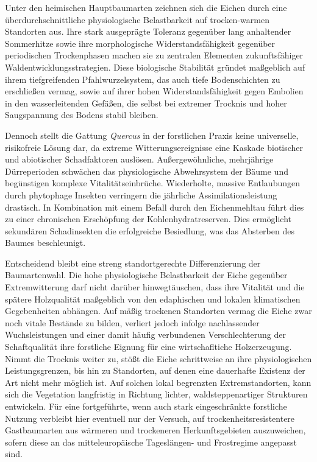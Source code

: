 \documentclass[twocolumn, bibliography=totoc, abstract=true]{scrartcl}
\begin{document}
Unter den heimischen Hauptbaumarten zeichnen sich die Eichen durch eine überdurchschnittliche physiologische Belastbarkeit auf trocken-warmen Standorten aus. Ihre stark ausgeprägte Toleranz gegenüber lang anhaltender Sommerhitze sowie ihre morphologische Widerstandsfähigkeit gegenüber periodischen Trockenphasen machen sie zu zentralen Elementen zukunftsfähiger Waldentwicklungsstrategien. Diese biologische Stabilität gründet maßgeblich auf ihrem tiefgreifenden Pfahlwurzelsystem, das auch tiefe Bodenschichten zu erschließen vermag, sowie auf ihrer hohen Widerstandsfähigkeit gegen Embolien in den wasserleitenden Gefäßen, die selbst bei extremer Trocknis und hoher Saugspannung des Bodens stabil bleiben.

Dennoch stellt die Gattung \textit{Quercus} in der forstlichen Praxis keine universelle, risikofreie Lösung dar, da extreme Witterungsereignisse eine Kaskade biotischer und abiotischer Schadfaktoren auslösen. Außergewöhnliche, mehrjährige Dürreperioden schwächen das physiologische Abwehrsystem der Bäume und begünstigen komplexe Vitalitätseinbrüche. Wiederholte, massive Entlaubungen durch phytophage Insekten verringern die jährliche Assimilationsleistung drastisch. In Kombination mit einem Befall durch den Eichenmehltau führt dies zu einer chronischen Erschöpfung der Kohlenhydratreserven. Dies ermöglicht sekundären Schadinsekten die erfolgreiche Besiedlung, was das Absterben des Baumes beschleunigt.

Entscheidend bleibt eine streng standortgerechte Differenzierung der Baumartenwahl. Die hohe physiologische Belastbarkeit der Eiche gegenüber Extremwitterung darf nicht darüber hinwegtäuschen, dass ihre Vitalität und die spätere Holzqualität maßgeblich von den edaphischen und lokalen klimatischen Gegebenheiten abhängen. Auf mäßig trockenen Standorten vermag die Eiche zwar noch vitale Bestände zu bilden, verliert jedoch infolge nachlassender Wuchsleistungen und einer damit häufig verbundenen Verschlechterung der Schaftqualität ihre forstliche Eignung für eine wirtschafltiche Holzerzeugung. Nimmt die Trocknis weiter zu, stößt die Eiche schrittweise an ihre physiologischen Leistungsgrenzen, bis hin zu Standorten, auf denen eine dauerhafte Existenz der Art nicht mehr möglich ist. Auf solchen lokal begrenzten Extremstandorten, kann sich die Vegetation langfristig in Richtung lichter, waldsteppenartiger Strukturen entwickeln. Für eine fortgeführte, wenn auch stark eingeschränkte forstliche Nutzung verbleibt hier eventuell nur der Versuch, auf trockenheitsresistentere Gastbaumarten aus wärmeren und trockeneren Herkunftsgebieten auszuweichen, sofern diese an das mitteleuropäische Tageslängen- und Frostregime angepasst sind.
\end{document}
